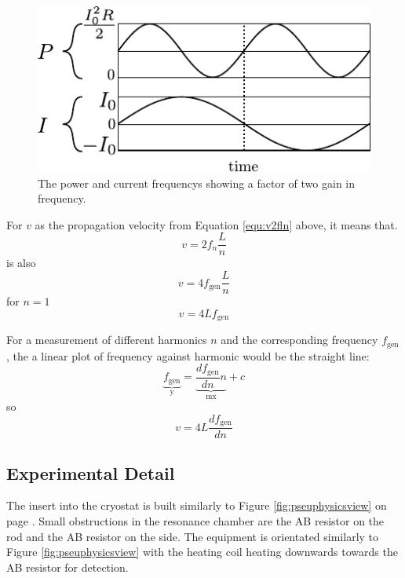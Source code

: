 \begin{figure}[htbp]
\centering
\includegraphics{pics/pirelation.pdf}
\caption{The power and current frequencys showing a factor of two gain in frequency.\label{fig:pirelation}}
\end{figure}

For $v$ as the propagation velocity from Equation \ref{equ:v2fln} above, it means that.
\begin{equation}
v = 2 f_n \frac{L}{n}
\end{equation}
is also
\begin{equation}
v = 4 f_\text{gen} \frac{L}{n} \label{equ:v4fgln}
\end{equation}
for $n=1$
\begin{equation}
v = 4 L f_\text{gen}
\end{equation}

For a measurement of different harmonics $n$ and the corresponding 
frequency $f_\text{gen}$, the a linear plot of frequency against harmonic would be the
straight line:
\begin{equation}
\underbrace{f_\text{gen}}_\text{y} = \underbrace{\frac{ d f_\text{gen}}{dn} n}_\text{mx} + c
\end{equation}
so 
\begin{equation}
v = 4 L \frac{ d f_\text{gen}}{dn} \label{equ:v4ldfdn}
\end{equation}

\subsection{Experimental Detail}

The insert into the cryostat is built similarly to Figure \ref{fig:pseuphysicsview}
on page \pageref{fig:pseuphysicsview}.
Small obstructions in the resonance chamber are 
the AB resistor on the rod and the AB resistor on the side.
The equipment is orientated similarly to Figure \ref{fig:pseuphysicsview} with the heating coil
heating downwards towards the AB resistor for detection.

